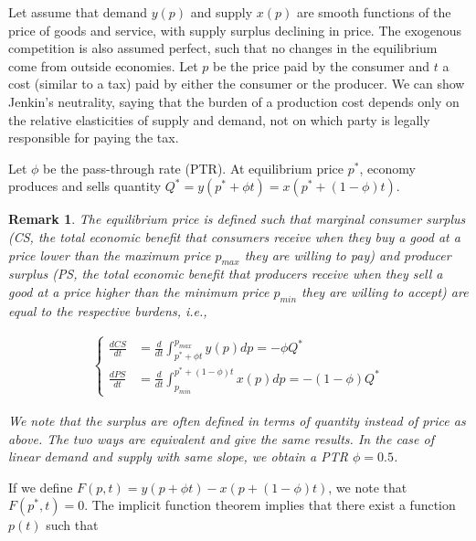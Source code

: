 \documentclass{article}
\newtheorem{remark}{Remark}
\begin{document}
Let assume that demand $y(p)$ and supply $x(p)$ are smooth functions of the price of goods and service, with supply surplus declining in price. The exogenous competition is also assumed perfect, such that no changes in the equilibrium come from outside economies. Let $p$ be the price paid by the consumer and $t$ a cost (similar to a tax) paid by either the consumer or the producer. We can show Jenkin's neutrality, saying that the burden of a production cost depends only on the relative elasticities of supply and demand, not on which party is legally responsible for paying the tax. 

\vspace{0.1cm}

Let $\phi$ be the pass-through rate (PTR). At equilibrium price $p^*$, economy produces and sells quantity $Q^*=y\left(p^* + \phi t \right)=x\left(p^*+(1-\phi)t \right)$. 

\begin{remark}
The equilibrium price is defined such that marginal \textit{consumer surplus} (CS, the total economic benefit that consumers receive when they buy a good at a price lower than the maximum price $p_{max}$ they are willing to pay) and \textit{producer surplus} (PS, the total economic benefit that producers receive when they sell a good at a price higher than the minimum price $p_{min}$ they are willing to accept) are equal to the respective burdens, i.e., 

\begin{align*}
    \begin{cases} 
    \frac{dCS}{dt} & = \frac{d}{dt} \int_{p^* + \phi t}^{p_{max}} y(p)dp = -\phi Q^*  \\
    \frac{dPS}{dt} & = \frac{d}{dt} \int_{p_{min}}^{p^* + (1 - \phi) t} x(p)dp = -(1-\phi) Q^*
    \end{cases}
\end{align*}

\noindent We note that the surplus are often defined in terms of quantity instead of price as above. The two ways are equivalent and give the same results. In the case of linear demand and supply with same slope, we obtain a PTR $\phi=0.5$. 
\end{remark}

\noindent If we define $F(p,t)=y\left(p + \phi t \right)-x\left(p+(1-\phi)t \right)$, we note that $F(p^*, t)=0$. %
The implicit function theorem implies that there exist a function $p(t)$ such that 
\end{document}
